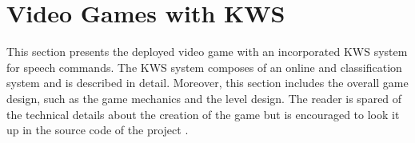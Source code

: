 
\chapter{Video Games with KWS}\label{sec:game}
This section presents the deployed video game with an incorporated KWS system for speech commands.
The KWS system composes of an online and classification system and is described in detail.
Moreover, this section includes the overall game design, such as the game mechanics and the level design.
The reader is spared of the technical details about the creation of the game but is encouraged to look it up in the source code of the project \cite{KWSGame}.



